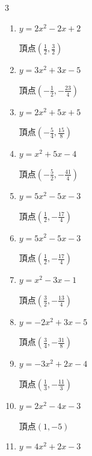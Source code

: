 \begin{multicols}{3}
\begin{enumerate}
        $\displaystyle 頂点\left( -\frac{1}{6} , -\frac{47}{12} \right)$

  \item $\displaystyle y=2x^{2}-2x+2$

        $\displaystyle 頂点\left( \frac{1}{2} , \frac{3}{2} \right)$

  \item $\displaystyle y=3x^{2}+3x-5$

        $\displaystyle 頂点\left( -\frac{1}{2} , -\frac{23}{4} \right)$

  \item $\displaystyle y=2x^{2}+5x+5$

        $\displaystyle 頂点\left( -\frac{5}{4} , \frac{15}{8} \right)$

\columnbreak %

  \item $\displaystyle y=x^{2}+5x-4$

        $\displaystyle 頂点\left( -\frac{5}{2} , -\frac{41}{4} \right)$

  \item $\displaystyle y=5x^{2}-5x-3$

        $\displaystyle 頂点\left( \frac{1}{2} , -\frac{17}{4} \right)$

  \item $\displaystyle y=5x^{2}-5x-3$

        $\displaystyle 頂点\left( \frac{1}{2} , -\frac{17}{4} \right)$

  \item $\displaystyle y=x^{2}-3x-1$

        $\displaystyle 頂点\left( \frac{3}{2} , -\frac{13}{4} \right)$

  \item $\displaystyle y=-2x^{2}+3x-5$

        $\displaystyle 頂点\left( \frac{3}{4} , -\frac{31}{8} \right)$

\columnbreak %

  \item $\displaystyle y=-3x^{2}+2x-4$

        $\displaystyle 頂点\left( \frac{1}{3} , -\frac{11}{3} \right)$

  \item $\displaystyle y=2x^{2}-4x-3$

        $\displaystyle 頂点\left( 1 , -5 \right)$

  \item $\displaystyle y=4x^{2}+2x-3$


\end{enumerate}
\end{multicols}
